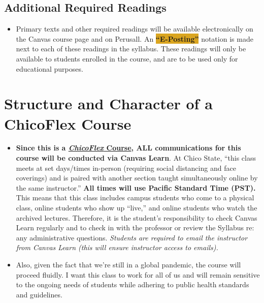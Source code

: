 \documentclass[11pt,]{article}
\providecommand{\tightlist}{%
  \setlength{\itemsep}{0pt}\setlength{\parskip}{0pt}}
\begin{document}
\hypertarget{additional-required-readings}{%
\subsection{Additional Required
Readings}\label{additional-required-readings}}

\begin{itemize}
\tightlist
\item
  Primary texts and other required readings will be available
  electronically on the Canvas course page and on Perusall. An
  \colorbox{Goldenrod}{\bf{“E-Posting”}} notation is made next to each
  of these readings in the syllabus. These readings will only be
  available to students enrolled in the course, and are to be used only
  for educational purposes.
\end{itemize}

\hypertarget{structure-and-character-of-a-chicoflex-course}{%
\section{Structure and Character of a ChicoFlex
Course}\label{structure-and-character-of-a-chicoflex-course}}

\begin{itemize}
\item
  \textbf{Since this is a
  \href{https://www.csuchico.edu/tlp/chicoflex/faq.shtml\#whatiscoflex}{\emph{ChicoFlex}
  Course}, ALL communications for this course will be conducted via
  Canvas Learn}. At Chico State, ``this class meets at set days/times
  in-person (requiring social distancing and face coverings) and is
  paired with another section taught simultaneously online by the same
  instructor.'' \textbf{All times will use Pacific Standard Time (PST).}
  This means that this class includes campus students who come to a
  physical class, online students who show up ``live,'' and online
  students who watch the archived lectures. Therefore, it is the
  student's responsibility to check Canvas Learn regularly and to check
  in with the professor or review the Syllabus re: any administrative
  questions. \emph{Students are required to email the instructor from
  Canvas Learn (this will ensure instructor access to emails).}
\item
  Also, given the fact that we're still in a global pandemic, the course
  will proceed fluidly. I want this class to work for all of us and will
  remain sensitive to the ongoing needs of students while adhering to
  public health standards and guidelines.
\end{itemize}
\end{document}

